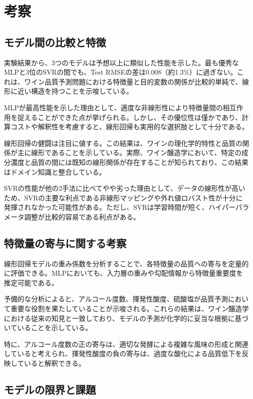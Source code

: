 \documentclass[12pt,a4paper,dvipdfmx]{jsarticle}
\begin{document}
\section{考察}

\subsection{モデル間の比較と特徴}

実験結果から、3つのモデルは予想以上に類似した性能を示した。最も優秀なMLPと3位のSVRの間でも、Test RMSEの差は0.008（約1.3\%）に過ぎない。これは、ワイン品質予測問題における特徴量と目的変数の関係が比較的単純で、線形に近い構造を持つことを示唆している。

MLPが最高性能を示した理由として、適度な非線形性により特徴量間の相互作用を捉えることができた点が挙げられる。しかし、その優位性は僅かであり、計算コストや解釈性を考慮すると、線形回帰も実用的な選択肢として十分である。

線形回帰の健闘は注目に値する。この結果は、ワインの理化学的特性と品質の関係が主に線形であることを示している。実際、ワイン醸造学において、特定の成分濃度と品質の間には既知の線形関係が存在することが知られており、この結果はドメイン知識と整合している。

SVRの性能が他の2手法に比べてやや劣った理由として、データの線形性が高いため、SVRの主要な利点である非線形マッピングや外れ値ロバスト性が十分に発揮されなかった可能性がある。ただし、SVRは学習時間が短く、ハイパーパラメータ調整が比較的容易である利点がある。

\subsection{特徴量の寄与に関する考察}

線形回帰モデルの重み係数を分析することで、各特徴量の品質への寄与を定量的に評価できる。MLPにおいても、入力層の重みや勾配情報から特徴量重要度を推定可能である。

予備的な分析によると、アルコール度数、揮発性酸度、硫酸塩が品質予測において重要な役割を果たしていることが示唆される。これらの結果は、ワイン醸造学における従来の知見と一致しており、モデルの予測が化学的に妥当な根拠に基づいていることを示している。

特に、アルコール度数の正の寄与は、適切な発酵による複雑な風味の形成と関連していると考えられ、揮発性酸度の負の寄与は、過度な酸化による品質低下を反映していると解釈できる。

\subsection{モデルの限界と課題}
\end{document}
